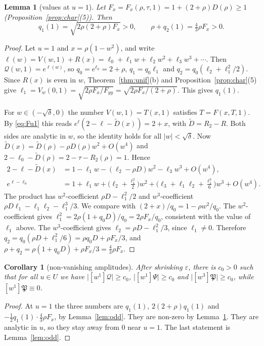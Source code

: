 \documentclass[11pt]{amsart}
\newtheorem{lemma}[theorem]{Lemma}
\newtheorem{corollary}[theorem]{Corollary}
\theoremstyle{definition}
\theoremstyle{remark}
\numberwithin{equation}{section}
\newcommand{\fP}{\mathfrak{P}}
\newcommand{\cQ}{\mathcal{Q}}
\newcommand{\abs}[1]{\lvert #1\rvert}
\begin{document}
\begin{lemma}[values at \(u=1\)]\label{lem:u1}
Let \(F_x=F_x(\rho,\tau,1)=1+(2+\rho)D(\rho)\ge1\) (Proposition~\ref{prop:char}(5)). Then
\[
q_1(1)=\sqrt{2\rho(2+\rho)F_x}>0,\qquad\rho+q_2(1)=\tfrac43\rho F_x>0 .
\]
\end{lemma}

\begin{proof}
Let \(u=1\) and \(x=\rho(1-w^2)\), and write \(\ell(w)=V(w,1)+R(x)=\ell_0+\ell_1w+\ell_2w^2+\ell_3w^3+\cdots\). Then \(\cQ(w,1)=e^{\ell(w)}\), so \(q_0=e^{\ell_0}=2+\rho\), \(q_1=q_0\ell_1\) and \(q_2=q_0(\ell_2+\ell_1^2/2)\). Since \(R(x)\) is even in \(w\), Theorem~\ref{thm:unif}(b) and Proposition~\ref{prop:char}(5) give \(\ell_1=V_w(0,1)=\sqrt{2\rho F_x/F_{yy}}=\sqrt{2\rho F_x/(2+\rho)}\). This gives \(q_1(1)\).

For \(w\in(-\sqrt\delta,0)\) the number \(V(w,1)=T(x,1)\) satisfies \(T=F(x,T,1)\). By \eqref{eq:Fu1} this reads \(e^{\ell}(2-\ell-\tilde D(x))=2+x\), with \(\tilde D=R_2-R\). Both sides are analytic in \(w\), so the identity holds for all \(\abs{w}<\sqrt\delta\). Now \(\tilde D(x)=\tilde D(\rho)-\rho D(\rho)w^2+O(w^4)\) and \(2-\ell_0-\tilde D(\rho)=2-\tau-R_2(\rho)=1\). Hence
\begin{align*}
2-\ell-\tilde D(x)&=1-\ell_1w-(\ell_2-\rho D)w^2-\ell_3w^3+O(w^4),\\
e^{\ell-\ell_0}&=1+\ell_1w+\bigl(\ell_2+\tfrac{\ell_1^2}{2}\bigr)w^2+\bigl(\ell_3+\ell_1\ell_2+\tfrac{\ell_1^3}{6}\bigr)w^3+O(w^4).
\end{align*}
The product has \(w^2\)-coefficient \(\rho D-\ell_1^2/2\) and \(w^3\)-coefficient \(\rho D\ell_1-\ell_1\ell_2-\ell_1^3/3\). We compare with \((2+x)/q_0=1-\rho w^2/q_0\). The \(w^2\)-coefficient gives \(\ell_1^2=2\rho(1+q_0D)/q_0=2\rho F_x/q_0\), consistent with the value of \(\ell_1\) above. The \(w^3\)-coefficient gives \(\ell_2=\rho D-\ell_1^2/3\), since \(\ell_1\ne0\). Therefore \(q_2=q_0(\rho D+\ell_1^2/6)=\rho q_0D+\rho F_x/3\), and \(\rho+q_2=\rho(1+q_0D)+\rho F_x/3=\frac43\rho F_x\).
\end{proof}

\begin{corollary}[non-vanishing amplitudes]\label{cor:amp}
After shrinking \(\varepsilon\), there is \(c_0>0\) such that for all \(u\in U\) we have \(\abs{[w^1]\cQ}\ge c_0\), \(\abs{[w^1]\Psi}\ge c_0\) and \(\abs{[w^3]\fP}\ge c_0\), while \([w^1]\fP\equiv0\).
\end{corollary}

\begin{proof}
At \(u=1\) the three numbers are \(q_1(1)\), \(2(2+\rho)q_1(1)\) and \(-\frac12q_1(1)\cdot\frac43\rho F_x\), by Lemma~\ref{lem:odd}. They are non-zero by Lemma~\ref{lem:u1}. They are analytic in \(u\), so they stay away from \(0\) near \(u=1\). The last statement is Lemma~\ref{lem:odd}.
\end{proof}
\end{document}
